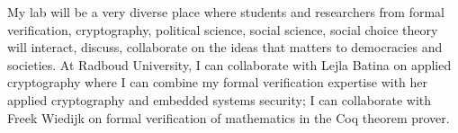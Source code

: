 \documentclass[a4paper]{article}
\begin{document}
My lab will be a very diverse place where students and researchers from formal 
verification, cryptography, 
political science, social science, social choice theory will interact, discuss, 
collaborate on the ideas that matters to democracies and societies. At Radboud University, 
I can collaborate with Lejla Batina on applied cryptography where 
I can combine my formal verification expertise with her applied cryptography and embedded systems security;
I can collaborate with Freek Wiedijk on formal verification of mathematics in the Coq 
theorem prover. 
\end{document}
